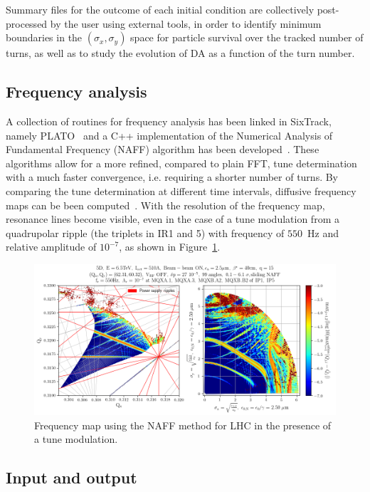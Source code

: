 \documentclass[a4paper,
              ]{jacow}
\begin{document}
Summary files for the outcome of each initial condition are collectively post-processed by the user using external tools, in order to identify minimum boundaries in the $(\sigma_{x},\sigma_{y})$ space for particle survival over the tracked number of turns, as well as to study the evolution of DA as a function of the turn number.

\subsection{Frequency analysis}

A collection of routines for frequency analysis has been linked in SixTrack, namely PLATO~\cite{plato} and a C++ implementation of the Numerical Analysis of Fundamental Frequency (NAFF) algorithm has been developed~\cite{naff}. These algorithms allow for a more refined, compared to plain FFT, tune determination with a much faster convergence, i.e. requiring a shorter number of turns. By comparing the tune determination at different time intervals,  diffusive frequency maps can be been computed~\cite{laskar}. With the resolution of the frequency map, resonance lines become visible, even in the case of a tune modulation from a quadrupolar ripple (the triplets in IR1 and 5) with frequency of $550$~Hz and relative amplitude of $10^{-7}$, as shown in Figure~\ref{fig:fma}.

\begin{figure}[!tbh]
\centering
 \includegraphics[width=\textwidth]{FMA.png}
 \caption{Frequency map using the NAFF method for LHC in the presence of a tune modulation.}
 \label{fig:fma}
\end{figure}

\subsection{Input and output}
\end{document}
